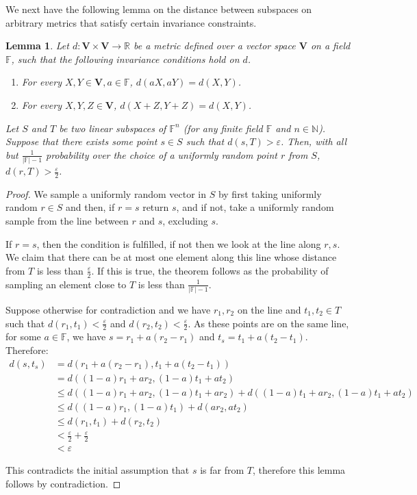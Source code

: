 \documentclass[11pt]{article}
\newtheorem{lemma}[theorem]{Lemma}
\begin{document}
We next have the following lemma on the distance between subspaces on arbitrary metrics that satisfy certain invariance constraints.
\begin{lemma}
\label{linSub}
Let $d : \mathbf{V} \times \mathbf{V} \rightarrow \mathbb{R}$ be a metric defined over a vector space $\mathbf{V}$ on a field $\mathbb{F}$, such that the following invariance conditions hold on $d$.
\begin{enumerate}
    \item For every $X,Y\in\mathbf{V}, a\in \mathbb{F}$, $d(aX,aY)=d(X,Y)$.
    \item For every $X,Y,Z\in\mathbf{V}$, $d(X+Z,Y+Z)=d(X,Y)$.
\end{enumerate}

Let $S$ and $T$ be two linear subspaces of $\mathbb{F}^{n}$ (for any finite field $\mathbb{F}$ and $n\in \mathbb{N}$). Suppose that there exists some point $s\in S$ such that $d(s,T)>\varepsilon$. Then, with all but $\frac{1}{\vert \mathbb{F}\vert -1}$ probability over the choice of a uniformly random point $r$ from $S$, $d(r,T)>\frac{\varepsilon}{2}$.
\end{lemma}

\begin{proof}
We sample a uniformly random vector in $S$ by first taking uniformly random $r\in S$ and then, if $r=s$ return $s$, and if not, take a uniformly random sample from the line between $r$ and $s$, excluding $s$.

If $r=s$, then the condition is fulfilled, if not then we look at the line along $r,s$. We claim that there can be at most one element along this line whose distance from $T$ is less than $\frac{\varepsilon}{2}$. If this is true, the theorem follows as the probability of sampling an element close to $T$ is less than $\frac{1}{|\mathbb{F}|-1}$. 

Suppose otherwise for contradiction and we have $r_{1}, r_{2}$ on the line and $t_{1}, t_{2}\in T$ such that $d(r_{1}, t_{1})< \frac{\varepsilon}{2}$ and $d(r_{2}, t_{2}) < \frac{\varepsilon}{2}$. As these points are on the same line, for some $a\in \mathbb{F}$, we have  $s=r_{1}+a(r_{2}-r_{1})$ and $t_{s}=t_{1}+a(t_{2}-t_{1})$. Therefore:
\[
\begin{split}
    d(s,t_{s})&=d(r_{1}+a(r_{2}-r_{1}),t_{1}+a(t_{2}-t_{1}))\\
    &= d((1-a)r_{1}+ar_{2},(1-a)t_{1}+at_{2})\\
    &\leq d((1-a)r_{1}+ar_{2},(1-a)t_{1}+ar_{2})+d((1-a)t_{1}+ar_{2},(1-a)t_{1}+at_{2})\\
    &\leq d((1-a)r_{1},(1-a)t_{1})+d(ar_{2},at_{2})\\
    &\leq d(r_{1},t_{1})+d(r_{2},t_{2})\\
    &< \frac{\varepsilon}{2}+\frac{\varepsilon}{2}\\
    &< \varepsilon
\end{split}
\]

This contradicts the initial assumption that $s$ is far from $T$, therefore this lemma follows by contradiction.
\end{proof}
\end{document}
